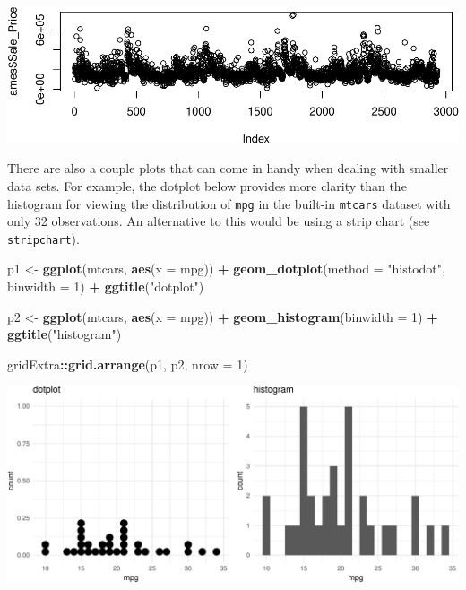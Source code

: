 \documentclass[]{article}
\newenvironment{Shaded}{\begin{snugshade}}{\end{snugshade}}
\newcommand{\KeywordTok}[1]{\textcolor[rgb]{0.13,0.29,0.53}{\textbf{#1}}}
\newcommand{\DataTypeTok}[1]{\textcolor[rgb]{0.13,0.29,0.53}{#1}}
\newcommand{\DecValTok}[1]{\textcolor[rgb]{0.00,0.00,0.81}{#1}}
\newcommand{\StringTok}[1]{\textcolor[rgb]{0.31,0.60,0.02}{#1}}
\newcommand{\OperatorTok}[1]{\textcolor[rgb]{0.81,0.36,0.00}{\textbf{#1}}}
\newcommand{\NormalTok}[1]{#1}
\begin{document}
\begin{center}\includegraphics{Chapter_3_-_Visualization_files/figure-latex/indexplot-1} \end{center}

There are also a couple plots that can come in handy when dealing with
smaller data sets. For example, the dotplot below provides more clarity
than the histogram for viewing the distribution of \texttt{mpg} in the
built-in \texttt{mtcars} dataset with only 32 observations. An
alternative to this would be using a strip chart (see
\texttt{stripchart}).

\begin{Shaded}
\begin{Highlighting}[]
\NormalTok{p1 <-}\StringTok{ }\KeywordTok{ggplot}\NormalTok{(mtcars, }\KeywordTok{aes}\NormalTok{(}\DataTypeTok{x =}\NormalTok{ mpg)) }\OperatorTok{+}
\StringTok{  }\KeywordTok{geom_dotplot}\NormalTok{(}\DataTypeTok{method =} \StringTok{"histodot"}\NormalTok{, }\DataTypeTok{binwidth =} \DecValTok{1}\NormalTok{) }\OperatorTok{+}
\StringTok{  }\KeywordTok{ggtitle}\NormalTok{(}\StringTok{"dotplot"}\NormalTok{)}

\NormalTok{p2 <-}\StringTok{ }\KeywordTok{ggplot}\NormalTok{(mtcars, }\KeywordTok{aes}\NormalTok{(}\DataTypeTok{x =}\NormalTok{ mpg)) }\OperatorTok{+}
\StringTok{  }\KeywordTok{geom_histogram}\NormalTok{(}\DataTypeTok{binwidth =} \DecValTok{1}\NormalTok{) }\OperatorTok{+}
\StringTok{  }\KeywordTok{ggtitle}\NormalTok{(}\StringTok{"histogram"}\NormalTok{)}

\NormalTok{gridExtra}\OperatorTok{::}\KeywordTok{grid.arrange}\NormalTok{(p1, p2, }\DataTypeTok{nrow =} \DecValTok{1}\NormalTok{)}
\end{Highlighting}
\end{Shaded}

\begin{center}\includegraphics{Chapter_3_-_Visualization_files/figure-latex/dotplot-1} \end{center}
\end{document}
